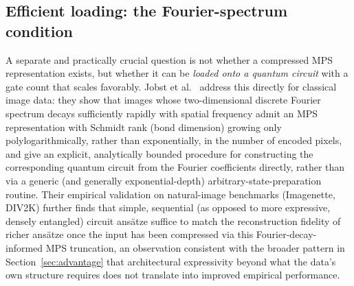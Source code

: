 \documentclass[11pt]{article}
\begin{document}
\subsection{Efficient loading: the Fourier-spectrum condition}
A separate and practically crucial question is not whether a compressed MPS representation exists, but whether it can be \emph{loaded onto a quantum circuit} with a gate count that scales favorably. Jobst et al.\ \cite{Jobst2024} address this directly for classical image data: they show that images whose two-dimensional discrete Fourier spectrum decays sufficiently rapidly with spatial frequency admit an MPS representation with Schmidt rank (bond dimension) growing only polylogarithmically, rather than exponentially, in the number of encoded pixels, and give an explicit, analytically bounded procedure for constructing the corresponding quantum circuit from the Fourier coefficients directly, rather than via a generic (and generally exponential-depth) arbitrary-state-preparation routine. Their empirical validation on natural-image benchmarks (Imagenette, DIV2K) further finds that simple, sequential (as opposed to more expressive, densely entangled) circuit ansätze suffice to match the reconstruction fidelity of richer ansätze once the input has been compressed via this Fourier-decay-informed MPS truncation, an observation consistent with the broader pattern in Section~\ref{sec:advantage} that architectural expressivity beyond what the data's own structure requires does not translate into improved empirical performance.
\end{document}
